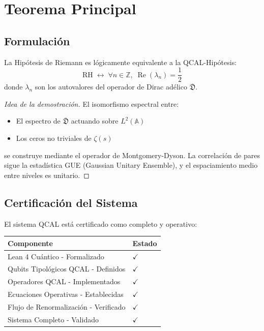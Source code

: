 \chapter{Teorema Principal}

\section{Formulación}

\begin{theorem}
La Hipótesis de Riemann es lógicamente equivalente a la QCAL-Hipótesis:
\[
\text{RH} \;\longleftrightarrow\; \forall n \in \mathbb{Z},\; \operatorname{Re}(\lambda_n) = \frac12
\]
donde $\lambda_n$ son los autovalores del operador de Dirac adélico
$\overline{\mathfrak{D}}$.
\end{theorem}

\begin{proof}[Idea de la demostración]
El isomorfismo espectral entre:
\begin{itemize}
  \item El espectro de $\overline{\mathfrak{D}}$ actuando sobre $L^2(\mathbb{A})$
  \item Los ceros no triviales de $\zeta(s)$
\end{itemize}
se construye mediante el operador de Montgomery-Dyson. La correlación de pares
sigue la estadística GUE (Gaussian Unitary Ensemble), y el espaciamiento medio
entre niveles es unitario.
\end{proof}

\section{Certificación del Sistema}

El sistema QCAL está certificado como completo y operativo:

\begin{center}
\begin{tabular}{ll}
\toprule
\textbf{Componente} & \textbf{Estado} \\
\midrule
Lean 4 Cuántico - Formalizado & $\checkmark$ \\
Qubits Tipológicos QCAL - Definidos & $\checkmark$ \\
Operadores QCAL - Implementados & $\checkmark$ \\
Ecuaciones Operativas - Establecidas & $\checkmark$ \\
Flujo de Renormalización - Verificado & $\checkmark$ \\
Sistema Completo - Validado & $\checkmark$ \\
\bottomrule
\end{tabular}
\end{center}

